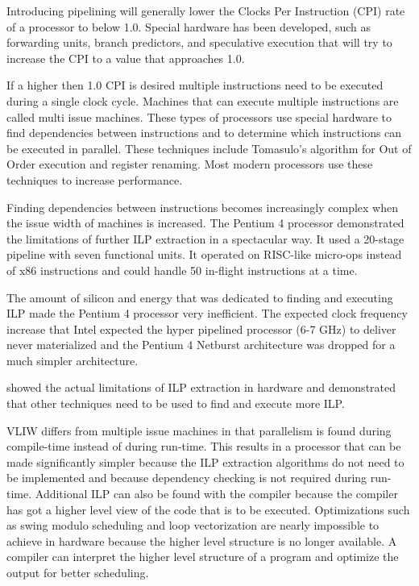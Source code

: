 Introducing pipelining will generally lower the Clocks Per Instruction (CPI) rate of a processor to below 1.0. Special hardware has been developed, such as forwarding units, branch predictors, and speculative execution that will try to increase the CPI to a value that approaches 1.0. 

If a higher then 1.0 CPI is desired multiple instructions need to be executed during a single clock cycle. Machines that can execute multiple instructions are called multi issue machines. These types of processors use special hardware to find dependencies between instructions and to determine which instructions can be executed in parallel. These techniques include Tomasulo’s algorithm for Out of Order execution and register renaming. Most modern processors use these techniques to increase performance.

Finding dependencies between instructions becomes increasingly complex when the issue width of machines is increased. The Pentium 4 processor demonstrated the limitations of further ILP extraction in a spectacular way. It used a 20-stage pipeline \cite{John-L.-Hennessy:2012bs} with seven functional units. It operated on RISC-like micro-ops instead of x86 instructions and could handle 50 in-flight instructions at a time.

The amount of silicon and energy that was dedicated to finding and executing ILP made the Pentium 4 processor very inefficient. The expected clock frequency increase that Intel expected the hyper pipelined processor (6-7 GHz) to deliver never materialized and the Pentium 4 Netburst architecture was dropped for a much simpler architecture.

\cite{Wall:1993xy} showed the actual limitations of ILP extraction in hardware and demonstrated that other techniques need to be used to find and execute more ILP.

VLIW differs from multiple issue machines in that parallelism is found during compile-time instead of during run-time. This results in a processor that can be made significantly simpler because the ILP extraction algorithms do not need to be implemented and because dependency checking is not required during run-time. Additional ILP can also be found with the compiler because the compiler has got a higher level view of the code that is to be executed. Optimizations such as swing modulo scheduling and loop vectorization are nearly impossible to achieve in hardware because the higher level structure is no longer available. A compiler can interpret the higher level structure of a program and optimize the output for better scheduling.

